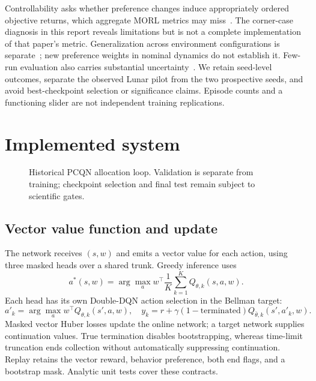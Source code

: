 Controllability asks whether preference changes induce appropriately ordered
objective returns, which aggregate MORL metrics may miss~\cite{delasheras2026controllability}.
The corner-case diagnosis in this report reveals limitations but is not a
complete implementation of that paper's metric. Generalization across
environment configurations is separate~\cite{teoh2025morl-generalization};
new preference weights in nominal dynamics do not establish it.
Few-run evaluation also carries substantial uncertainty~\cite{agarwal2021evaluation}.
We retain seed-level outcomes, separate the observed Lunar pilot from the two
prospective seeds, and avoid best-checkpoint selection or significance claims.
Episode counts and a functioning slider are not independent training replications.

\section{Implemented system}
\begin{figure}[htbp]
\centering
\resizebox{\textwidth}{!}{}
\caption{Historical PCQN allocation loop. Validation is separate from training;
checkpoint selection and final test remain subject to scientific gates.}
\end{figure}

\subsection{Vector value function and update}
The network receives $(s,w)$ and emits a vector value for each action, using
three masked heads over a shared trunk. Greedy inference uses
\[
 a^*(s,w)=\arg\max_a w^\top\frac1K\sum_{k=1}^K Q_{\theta,k}(s,a,w).
\]
Each head has its own Double-DQN action selection in the Bellman target:
\[
 a'_k=\arg\max_a w^\top Q_{\theta,k}(s',a,w),\quad
 y_k=r+\gamma(1-\mathrm{terminated})Q_{\bar\theta,k}(s',a'_k,w).
\]
Masked vector Huber losses update the online network; a target network supplies
continuation values. True termination disables bootstrapping, whereas time-limit
truncation ends collection without automatically suppressing continuation.
Replay retains the vector reward, behavior preference, both end flags, and a
bootstrap mask. Analytic unit tests cover these contracts.

